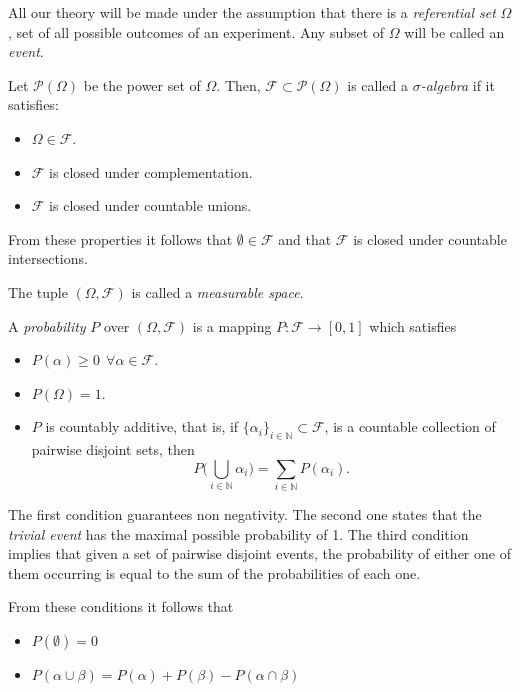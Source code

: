 
All our theory will be made under the assumption that there is a
\emph{referential set} \(\Omega\), set of all possible outcomes of an experiment. Any subset of
\(\Omega\) will be called an \emph{event}.

\begin{definition}
Let \(\mathcal{P}(\Omega)\) be the power set of \(\Omega\). Then, \(\mathcal{F} \subset \mathcal{P}(\Omega)\) is called a
\emph{\(\sigma\)-algebra} if it satisfies:
\begin{itemize}
\item \(\Omega \in \mathcal{F}\).
\item \(\mathcal{F}\) is closed under complementation.
\item \(\mathcal{F}\) is closed under countable unions.
\end{itemize}
From these properties it follows that \(\emptyset \in \mathcal{F}\) and that \(\mathcal{F}\)
is closed under countable intersections.

The tuple \((\Omega, \mathcal{F})\) is called a \emph{measurable space}.
\end{definition}

\begin{definition}
A \emph{probability} \(P\) over \((\Omega, \mathcal{F})\) is a mapping
\(P: \mathcal{F} \to [0,1]\) which satisfies
\begin{itemize}
\item \(P(\alpha) \geq 0 \ \ \forall \alpha \in \mathcal{F}\).
\item \(P(\Omega) = 1\).
\item \(P\) is countably additive, that is, if \(\{\alpha_i\}_{i \in \mathbb{N}}
  \subset \mathcal{F}\), is a countable collection of pairwise disjoint sets,
  then
  \[
  P\big(\bigcup_{i\in \mathbb{N}}\alpha_i\big) = \sum_{i\in \mathbb{N}}P(\alpha_i).
  \]
\end{itemize}
\end{definition}

The first condition guarantees non negativity. The second one states that the
\emph{trivial event} has the maximal possible probability of 1.
The third condition implies that given a set of pairwise disjoint events,
the probability of either one of them occurring is equal to the sum of the
probabilities of each one.

From these conditions it follows that
\begin{itemize}
\item \(P(\emptyset) = 0\)
\item \(P(\alpha \cup \beta) = P(\alpha) + P(\beta) - P(\alpha \cap \beta)\)
\end{itemize}

